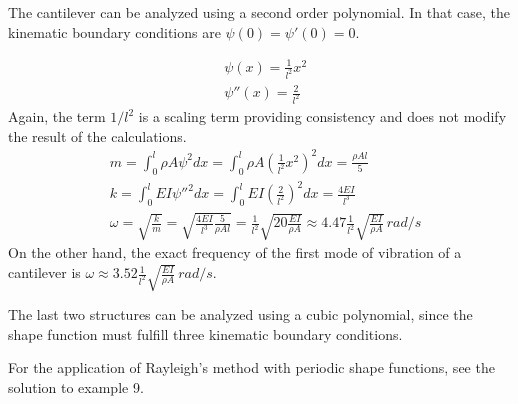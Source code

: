 \begin{Answer}[ref={rayleigh_sdof}]
\parbox{.7\textwidth}{The cantilever can be analyzed using a second order polynomial. In that case, the kinematic boundary conditions are $\psi(0) = \psi'(0) = 0$.} \hspace{1em}
\parbox{.25\textwidth}{}
\begin{align*}
&\psi(x) = \frac{1}{l^2} x^2 \\
&\psi''(x) = \frac{2}{l^2}
\end{align*}
Again, the term $1/l^2$ is a scaling term providing consistency and does not modify the result of the calculations.
\begin{align*}
&m = \int_0^l \rho A\psi^2dx = \int_0^l \rho A \left(\frac{1}{l^2} x^2\right)^2dx = \frac{\rho Al}{5} \\
&k = \int_0^l EI \psi''^2 dx = \int_0^l EI \left(\frac{2}{l^2}\right)^2dx = \frac{4EI}{l^3} \\
&\omega = \sqrt{\frac{k}{m}} = \sqrt{\frac{4EI}{l^3}\frac{5}{\rho Al}} = \frac{1}{l^2}\sqrt{20\frac{EI}{\rho A}} \approx 4.47\frac{1}{l^2}\sqrt{\frac{EI}{\rho A}}\,\si{rad/s}
\end{align*}
On the other hand, the exact frequency of the first mode of vibration of a cantilever is $\omega\approx3.52\frac{1}{l^2}\sqrt{\frac{EI}{\rho A}}\,\si{rad/s}$.

The last two structures can be analyzed using a cubic polynomial, since the shape function must fulfill three kinematic boundary conditions.

For the application of Rayleigh's method with periodic shape functions, see the solution to example 9.
\end{Answer}
